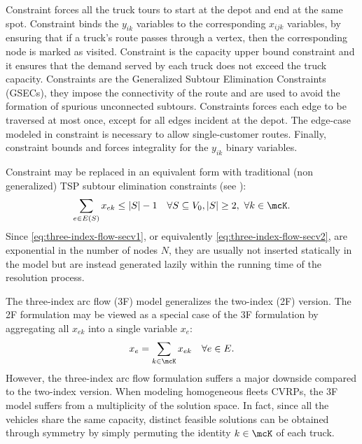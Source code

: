 Constraint  forces all the truck tours to start at the depot and end at the same spot.
Constraint  binds the $y_{ik}$ variables to the corresponding $x_{ijk}$ variables, by ensuring that if a truck's route passes through a vertex, then the corresponding node is marked as visited.
Constraint  is the capacity upper bound constraint and it ensures that the demand served by each truck does not exceed the truck capacity.
Constraints  are the Generalized Subtour Elimination Constraints (GSECs), they impose the connectivity of the route and are used to avoid the formation of spurious unconnected subtours.
Constraints  forces each edge to be traversed at most once,
except for all edges incident at the depot.
The edge-case modeled in constraint 
is necessary to allow single-customer routes.
Finally, constraint 
bounds and forces integrality for the $y_{ik}$ binary variables.

Constraint  may be replaced in an equivalent form
with traditional (non generalized) TSP subtour elimination constraints (see \cite{fisher1981}):
\begin{equation}\label{eq:three-index-flow-secv2}
	\sum_{e \in E(S)} x_{ek} \le |S| - 1 \quad \forall S \subseteq V_0, |S| \ge 2,\ \forall k \in \mcK.
\end{equation}
Since \cref{eq:three-index-flow-secv1}, or equivalently \cref{eq:three-index-flow-secv2},
are exponential in the number of nodes $N$,
they are usually not inserted statically in the model
but are instead generated lazily within the running time of the resolution process.

The three-index arc flow (3F) model generalizes the two-index (2F) version.
The 2F formulation may be viewed as a special case of the 3F formulation by aggregating
all $x_{ek}$ into a single variable $x_e$:
\begin{equation}
	x_e = \sum_{k \in \mcK} x_{ek} \quad \forall e \in E.
\end{equation}
However, the three-index arc flow formulation suffers a major downside compared to the two-index version.
When modeling homogeneous fleets CVRPs, the 3F model suffers from a multiplicity of the solution space.
In fact, since all the vehicles share the same capacity,
distinct feasible solutions can be obtained through symmetry
by simply permuting the identity $k \in \mcK$ of each truck.

